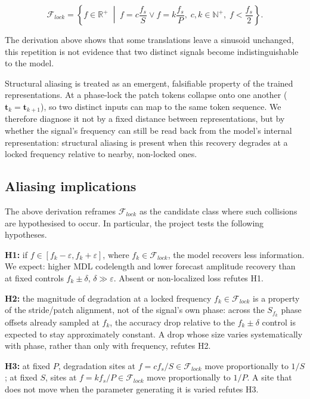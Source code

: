 \begin{equation}
\label{eq:flock_set}
\mathcal F_{lock}
=
\left\{
f\in\mathbb{R}^{+}
\;\middle|\;
f
=
c\frac{f_s}{S}
\lor
f
=
k\frac{f_s}{P},
\;
c, k\in\mathbb{N}^{+},
\;
f<\frac{f_s}{2}
\right\}.
\end{equation}

The derivation above shows that some translations leave a sinusoid unchanged, this repetition is not evidence that two distinct signals become indistinguishable to the model. 

Structural aliasing is treated as an emergent, falsifiable property of the trained representations\cite{paganiPreliminaryInsightsChronos2026}. At a phase-lock the patch tokens collapse onto one another ($\mathbf{t}_k=\mathbf{t}_{k+1}$), so two distinct inputs can map to the same token sequence. We therefore diagnose it not by a fixed distance between representations, but by whether the signal's frequency can still be read back from the model's internal representation: structural aliasing is present when this recovery degrades at a locked frequency relative to nearby, non-locked ones.

\subsection{Aliasing implications}
The above derivation reframes $\mathcal F_{lock}$ as the candidate class where such collisions are hypothesised to occur. In particular, the project tests the following hypotheses.

\textbf{H1:} if $f\in[f_k-\varepsilon,f_k+\varepsilon]$, where $f_k\in\mathcal F_{lock}$, the model recovers less information. We expect: higher MDL codelength and lower forecast amplitude recovery than at fixed controls $f_k\pm\delta$, $\delta\gg\varepsilon$. Absent or non-localized loss refutes H1.

\textbf{H2:} the magnitude of degradation at a locked frequency $f_k\in\mathcal F_{lock}$ is a property of the stride/patch alignment, not of the signal's own phase: across the $S_{f_k}$ phase offsets already sampled at $f_k$, the accuracy drop relative to the $f_k\pm\delta$ control is expected to stay approximately constant. A drop whose size varies systematically with phase, rather than only with frequency, refutes H2.

\textbf{H3:} at fixed $P$, degradation sites at $f=c f_s/S \in \mathcal F_{lock}$ move proportionally to $1/S$; at fixed $S$, sites at $f=k f_s/P \in \mathcal F_{lock}$ move proportionally to $1/P$. A site that does not move when the parameter generating it is varied refutes H3.

